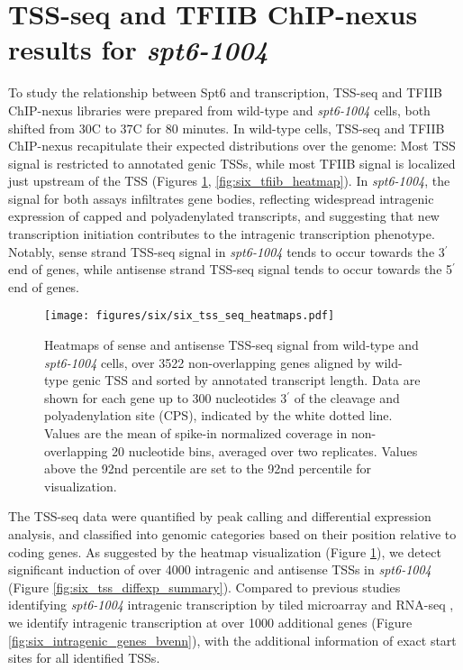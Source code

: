 \section{TSS-seq and TFIIB ChIP-nexus results for \textit{spt6-1004}}
\label{sec:six_tss_tfiib}

To study the relationship between Spt6 and transcription, TSS-seq and TFIIB ChIP-nexus libraries were prepared from wild-type and \textit{spt6-1004} cells, both shifted from 30\textdegree C to 37\textdegree C for 80 minutes.
In wild-type cells, TSS-seq and TFIIB ChIP-nexus recapitulate their expected distributions over the genome: Most TSS signal is restricted to annotated genic TSSs, while most TFIIB signal is localized just upstream of the TSS (Figures \ref{fig:six_tss_seq_heatmaps}, \ref{fig:six_tfiib_heatmap}).
In \textit{spt6-1004}, the signal for both assays infiltrates gene bodies, reflecting widespread intragenic expression of capped and polyadenylated transcripts, and suggesting that new transcription initiation contributes to the intragenic transcription phenotype.
Notably, sense strand TSS-seq signal in \textit{spt6-1004} tends to occur towards the 3$^\prime$ end of genes, while antisense strand TSS-seq signal tends to occur towards the 5$^\prime$ end of genes.

\begin{figure}[H]
\centering
\texttt{[image: figures/six/six\_tss\_seq\_heatmaps.pdf]}
\caption[Heatmaps of sense and antisense TSS-seq signal from wild-type and \textit{spt6-1004} cells, over non-overlapping coding genes.]{Heatmaps of sense and antisense TSS-seq signal from wild-type and \textit{spt6-1004} cells, over 3522 non-overlapping genes aligned by wild-type genic TSS and sorted by annotated transcript length. Data are shown for each gene up to 300 nucleotides 3$^\prime$ of the cleavage and polyadenylation site (CPS), indicated by the white dotted line. Values are the mean of spike-in normalized coverage in non-overlapping 20 nucleotide bins, averaged over two replicates. Values above the 92nd percentile are set to the 92nd percentile for visualization.}
\label{fig:six_tss_seq_heatmaps}
\end{figure}

The TSS-seq data were quantified by peak calling and differential expression analysis, and classified into genomic categories based on their position relative to coding genes.
As suggested by the heatmap visualization (Figure \ref{fig:six_tss_seq_heatmaps}), we detect significant induction of over 4000 intragenic and antisense TSSs in \textit{spt6-1004} (Figure \ref{fig:six_tss_diffexp_summary}).
Compared to previous studies identifying \textit{spt6-1004} intragenic transcription by tiled microarray and RNA-seq \citep{cheung2008, uwimana2017}, we identify intragenic transcription at over 1000 additional genes (Figure \ref{fig:six_intragenic_genes_bvenn}), with the additional information of exact start sites for all identified TSSs.

